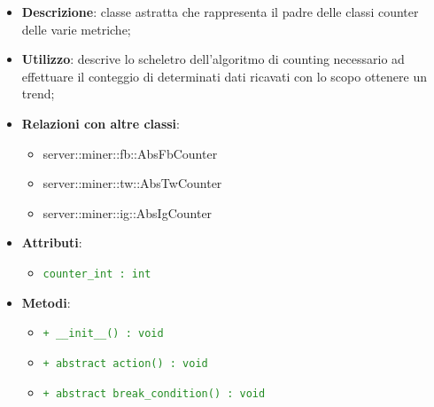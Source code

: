 			\begin{itemize}
				\item \textbf{Descrizione}: classe astratta che rappresenta il padre delle classi counter delle varie metriche;
				\item \textbf{Utilizzo}: descrive lo scheletro dell'algoritmo di counting necessario ad effettuare il conteggio di determinati dati ricavati con lo scopo ottenere un trend;
				\item \textbf{Relazioni con altre classi}:
					\begin{itemize}
						\item server::miner::fb::AbsFbCounter
						\item server::miner::tw::AbsTwCounter
						\item server::miner::ig::AbsIgCounter
					\end{itemize}
				\item \textbf{Attributi}: 
					\begin{itemize}
						\item \textcolor{forestgreen}{\texttt{counter\_int : int}}
					\end{itemize}
				\item \textbf{Metodi}:   
					\begin{itemize}
						\item \textcolor{forestgreen}{\texttt{+ \_\_init\_\_() : void}}
						\item \textcolor{forestgreen}{\texttt{+ abstract action() : void}}
						\item \textcolor{forestgreen}{\texttt{+ abstract break\_condition() : void}}
						\begin{description}

\end{description}
\end{itemize}
\end{itemize}
